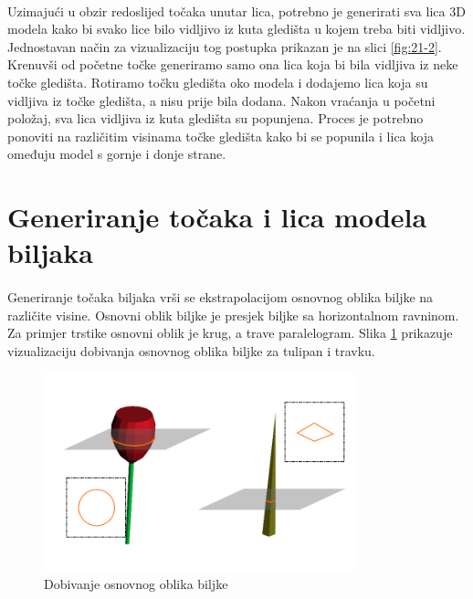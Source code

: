 \documentclass[times, utf8, diplomski]{fer}
\begin{document}
\paragraph{}
Uzimajući u obzir redoslijed točaka unutar lica, potrebno je generirati sva lica 3D modela 
kako bi svako lice bilo vidljivo iz kuta gledišta u kojem treba biti vidljivo. Jednostavan 
način za vizualizaciju tog postupka prikazan je na slici \ref{fig:21-2}. Krenuvši od 
početne točke generiramo samo ona lica koja bi bila vidljiva iz neke točke gledišta. 
Rotiramo točku gledišta oko modela i dodajemo lica koja su vidljiva iz točke gledišta, a 
nisu prije bila dodana. Nakon vraćanja u početni položaj, sva lica vidljiva iz kuta 
gledišta su popunjena. Proces je potrebno ponoviti na različitim visinama točke gledišta 
kako bi se popunila i lica koja omeđuju model s gornje i donje strane.


\section{Generiranje točaka i lica modela biljaka} \label{plant_gen}
\paragraph{}
Generiranje točaka biljaka vrši se ekstrapolacijom osnovnog oblika biljke na različite 
visine. Osnovni oblik biljke je presjek biljke sa horizontalnom ravninom. Za primjer 
trstike osnovni oblik je krug, a trave paralelogram. Slika \ref{fig:22-1} prikazuje 
vizualizaciju dobivanja osnovnog oblika biljke za tulipan i travku.

\begin{figure}[h]
	\centering
	\includegraphics[width=0.8\textwidth]{img/22-1}
	\caption{Dobivanje osnovnog oblika biljke}
	\label{fig:22-1}
\end{figure}
\end{document}
